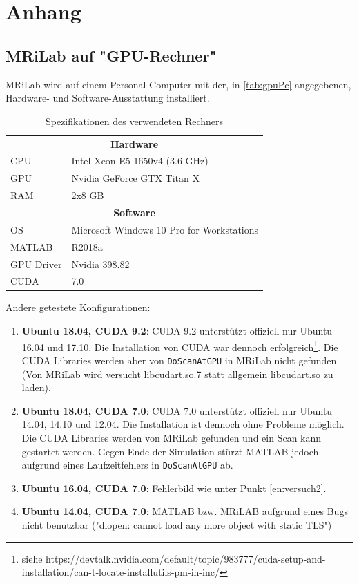 \chapter{Anhang}

\section{MRiLab auf "GPU-Rechner"}%
\label{sec:usedPC}
MRiLab wird auf einem Personal Computer mit der, in \autoref{tab:gpuPc} angegebenen, Hardware- und Software-Ausstattung installiert.

\begin{table}[H]
	\centering
	\caption{Spezifikationen des verwendeten Rechners}
	\begin{tabular}{ll}
		\toprule
		\multicolumn{2}{c}{\textbf{Hardware}} \\
		CPU & Intel Xeon E5-1650v4 (3.6 GHz) \\
		GPU & Nvidia GeForce GTX Titan X \\
		RAM & 2x8 GB \\
		\midrule
		\multicolumn{2}{c}{\textbf{Software}} \\
		OS & Microsoft Windows 10 Pro for Workstations \\
		MATLAB & R2018a \\
		GPU Driver & Nvidia 398.82 \\
		CUDA & 7.0 \\
		\bottomrule
	\end{tabular}
	\label{tab:gpuPc}
\end{table}

Andere getestete Konfigurationen:
\begin{enumerate}
	\item \textbf{Ubuntu 18.04, CUDA 9.2}: CUDA 9.2 unterstützt offiziell nur Ubuntu 16.04 und 17.10. Die Installation von CUDA war dennoch erfolgreich\footnote{siehe https://devtalk\-.nvidia.com/\-default/topic/983777/\-cuda-setup-and-installation\-/can-t-locate-installutils\--pm-in-inc/}. 
	Die CUDA Libraries werden aber von \texttt{DoScanAtGPU} in MRiLab nicht gefunden (Von MRiLab wird versucht libcudart.so.7 statt allgemein libcudart.so zu laden).
	
	\item\label{en:versuch2} \textbf{Ubuntu 18.04, CUDA 7.0}: CUDA 7.0 unterstützt offiziell nur Ubuntu 14.04, 14.10 und 12.04. Die Installation ist dennoch ohne Probleme möglich. Die CUDA Libraries werden von MRiLab gefunden und ein Scan kann gestartet werden. Gegen Ende der Simulation stürzt MATLAB jedoch aufgrund eines Laufzeitfehlers in \texttt{DoScanAtGPU} ab.
	
	\item \textbf{Ubuntu 16.04, CUDA 7.0}: Fehlerbild wie unter Punkt \ref{en:versuch2}.
	
	\item \textbf{Ubuntu 14.04, CUDA 7.0}: MATLAB bzw. MRiLAB aufgrund eines Bugs nicht benutzbar ("dlopen: cannot load any more object with static TLS")
	
\end{enumerate}

